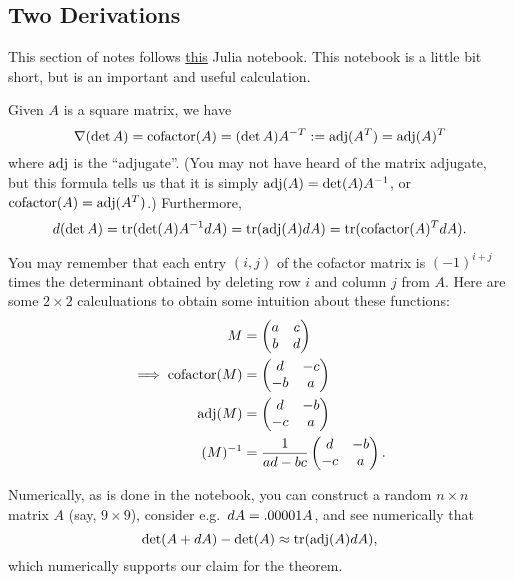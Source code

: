 \subsection{Two Derivations}

This section of notes follows \href{https://rawcdn.githack.com/mitmath/matrixcalc/b08435612045b17745707f03900e4e4187a6f489/notes/determinant_and_inverse.html}{this} Julia notebook. This notebook is a little bit short, but is an important and useful calculation.

\begin{theorem}
    Given $A$ is a square matrix, we have 
    \[
    \nabla (\det A) = \mathrm{cofactor}(A) = (\det A)A^{-T} := \operatorname{adj}(A^T) = \operatorname{adj}(A)^T 
    \]
    where $\operatorname{adj}$ is the ``adjugate''.   (You may not have heard of the matrix adjugate, but this formula tells us that it is simply $\operatorname{adj}(A) = \det(A) A^{-1}$, or $\mathrm{cofactor}(A) = \operatorname{adj}(A^T)$.) Furthermore, 
    \[
    d (\det A) = \operatorname{tr}(\det(A) A^{-1} d A) = \operatorname{tr} (\operatorname{adj}(A) d A) = \operatorname{tr}(\mathrm{cofactor} (A)^T d A).
    \]
\end{theorem}

You may remember that each entry $(i,j)$ of the cofactor matrix is $(-1)^{i + j}$ times the determinant obtained by deleting row $i$ and column $j$ from $A$. Here are some $2 \times 2$ calculuations to obtain some intuition about these functions: 
\begin{align}
    M &= \begin{pmatrix}
        a & c \\ b & d    
    \end{pmatrix} \\
    \implies \mathrm{cofactor}(M) &= \begin{pmatrix}
         d & -c \\ -b & a
    \end{pmatrix}  \\
    \operatorname{adj}(M) &= \begin{pmatrix}
d & -b \\ -c & a
\end{pmatrix} \\
(M)^{-1}  &= \frac{1}{ad-bc} \begin{pmatrix}
    d & -b \\ -c & a
\end{pmatrix}.
\end{align}

Numerically, as is done in the notebook, you can construct a random $n \times n$ matrix $A$ (say, $9 \times 9$), consider e.g.~$d A = .00001 A$, and see numerically that 
\[
\det(A + d A) - \det (A) \approx \operatorname{tr}(\operatorname{adj}(A) d A),
\]
which numerically supports our claim for the theorem. 

